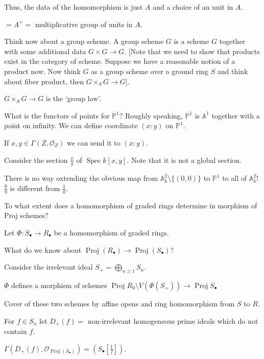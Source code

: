 \documentclass{article}
\theoremstyle{definition}
\begin{document}
    Thus, the data of the homomorphism is just \(A\) and a choice of an unit in \(A\).

    \(= A^\times =\) multiplicative group of units in \(A\).

    Think now about a group scheme. A group scheme \(G\) is a scheme \(G\) together with some additional data \(G \times G \to G\). [Note that we need to show that products exist in the category of scheme. Suppose we have a reasonable notion of a product now. Now think \(G\) as a group scheme over a ground ring \(S\) and think about fiber product, then \(G \times _S G \to G\)].

    \(G \times_S G \to G\) is the `group law'.

    What is the functors of points for \(\mathbb{P}^1\)? Roughly speaking, \(\mathbb{P}^1\) is \(\mathbb{A}^1\) together with a point on infinity. We can define coordinate \((x:y)\) on \(\mathbb{P}^1\).

    If \(x,y\in \Gamma(Z, \mathcal{O}_Z)\) we can send it to \((x:y)\).

    Consider the section \(\frac{x}{y}\) of \(\operatorname{Spec} k[x,y]\). Note that it is not a global section.

    There is no way oxtending the obvious map from \(\mathbb{A}^2_k \setminus \{ (0,0) \} \) to \(\mathbb{P}^1\) to all of \(\mathbb{A}^2_k\)! \(\frac{0}{0}\) is different from \(\frac{1}{0}\).
    
    To what extent does a homomorphism of graded rings determine in morphism of Proj schemes?

    Let \(\Phi : S_\bullet \to R_\bullet\) be a homomorphism of graded rings.

    What do we know about \(\operatorname{Proj}(R_\bullet) \to \operatorname{Proj}(S_\bullet)\)?

    Consider the irrelevant ideal \(S_+ = \bigoplus_{n\geq 1} S_n\).
    
    \(\Phi\) defines a morphism of schemes \(\operatorname{Proj} R_0 \setminus V(\Phi(S_+)) \to \operatorname{Proj} S_\bullet\) 

    Cover of these two schemes by affine opens and ring homomorphism from \(S\) to \(R\).

    For \(f\in S_n\) let \(D_+(f) =\) non-irrelevant homogeneous prime ideals which do not contain \(f\).

    \(\Gamma (D_+(f), \mathcal{O}_{\operatorname{Proj}(S_\bullet)}) = \left(S_\bullet \left[ \frac{1}{f} \right] \right)\).
    
\end{document}

